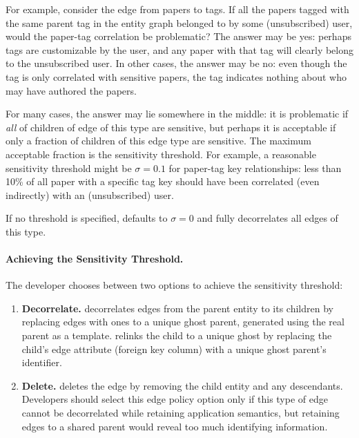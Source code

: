 For example, consider the edge from papers to tags. If all the papers tagged with the same parent
tag in the entity graph belonged to by some (unsubscribed) user, would the paper-tag correlation be
problematic? The answer may be yes: perhaps tags are customizable by the user, and any paper with
that tag will clearly belong to the unsubscribed user. In other cases, the answer may be no: even
though the tag is only correlated with sensitive papers, the tag indicates nothing about who may
have authored the papers.

For many cases, the answer may lie somewhere in the middle: it is problematic if \emph{all} of
children of edge of this type are sensitive, but perhaps it is acceptable if only a fraction of
children of this edge type are sensitive. The maximum acceptable fraction is the sensitivity
threshold. For example, a reasonable sensitivity threshold might be $\sigma = 0.1$ for paper-tag
key relationships: less than 10\% of all paper with a specific tag key should have been correlated
(even indirectly) with an (unsubscribed) user. 

If no threshold is specified, \sys defaults to $\sigma=0$ and fully
decorrelates all edges of this type. 

\paragraph{Achieving the Sensitivity Threshold.}
The developer chooses between two options to achieve the sensitivity threshold: 
\begin{enumerate}
    \item \textbf{Decorrelate.}
    \sys decorrelates edges from the parent entity to its children by 
    replacing edges with ones to a unique ghost parent, generated using the
    real parent as a template. \sys relinks the child to a unique ghost by replacing the child's edge
    attribute (foreign key column) with a unique ghost parent's identifier. 

\item \textbf{Delete.}
    \sys deletes the edge by removing the child entity and any descendants. Developers should select
    this edge policy option only if this type of edge cannot be decorrelated while retaining application
    semantics, but retaining edges to a shared parent would reveal too much identifying information.
\end{enumerate}

